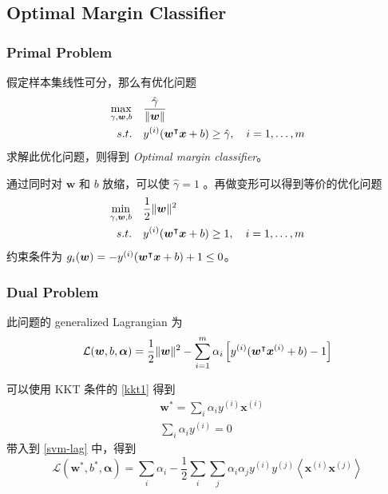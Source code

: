 \subsection{Optimal Margin Classifier}
	\subsubsection{Primal Problem}
		假定样本集线性可分，那么有优化问题
		\begin{align*}
			\max_{\gamma, \bm{w}, b}\quad & \frac{\hat{\gamma}}{\| \bm{w} \|} \\
			s.t. \quad & y^{(i)} (\bm{w^}\intercal \bm{x} + b) \geq \hat{\gamma}, \quad i = 1, \ldots, m
		\end{align*}
		求解此优化问题，则得到 \emph{Optimal margin classifier}。
		
		通过同时对 $ \bm{w} $ 和 $ b $ 放缩，可以使 $ \hat{\gamma} = 1 $ 。再做变形可以得到等价的优化问题
		\begin{align}
			\min_{\gamma, \bm{w}, b}\quad & \frac{1}{2} \| \bm{w} \| ^2 \\
			s.t. \quad & y^{(i)} (\bm{w^}\intercal \bm{x} + b) \geq 1, \quad i = 1, \ldots, m
		\end{align}
		约束条件为 $ g_i(\bm{w}) = -y^{(i)} (\bm{w^}\intercal \bm{x} + b) + 1 \leq 0 $。
		
	\subsubsection{Dual Problem}
		此问题的 generalized Lagrangian 为
		\begin{equation}
			\mathcal{L}(\bm{w}, b, \bm{\alpha}) = \frac{1}{2} \| \bm{w} \| ^2 - \sum_{i=1}^m \alpha_i \left[ y^{(i)} (\bm{w^}\intercal \bm{x}^{(i)} + b) - 1 \right] \label{svm-lag}
		\end{equation}
		
		可以使用 KKT 条件的 \eqref{kkt1} 得到
		\begin{align}
			&\bm{w}^* = \sum_i{\alpha_i y^{(i)} \bm{x}^{(i)}} \label{svm-kkt1-1} \\ 
			&\sum_i{\alpha_i y^{(i)}} = 0 \label{svm-kkt1-2}
		\end{align}
		带入到 \eqref{svm-lag} 中，得到
		\begin{equation*}
			\mathcal{L}(\bm{w}^*, b^*, \bm{\alpha}) = \sum_i{\alpha_i} - \frac{1}{2} \sum_i \sum_j {\alpha_i \alpha_j y^{(i)} y^{(j)} \left\langle \bm{x}^{(i)} \bm{x}^{(j)} \right\rangle }
		\end{equation*}
		
